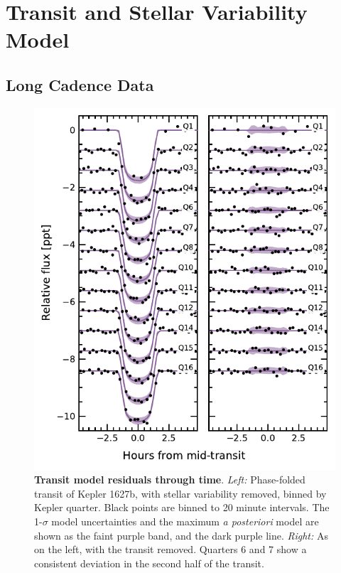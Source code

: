 \documentclass[12pt,modern,tighten]{aastex63}
\begin{document}
\section{Transit and Stellar Variability Model}
\label{app:gptransit}

\subsection{Long Cadence Data}
\begin{figure}[t]
	\begin{center}
		\leavevmode
		\includegraphics[width=1\textwidth]{f9.pdf}
	\end{center}
	\vspace{-0.7cm}
	\caption{
		{\bf Transit model residuals through time}.  
    {\it Left:}
		Phase-folded transit of Kepler 1627b, with stellar
    variability removed, binned by Kepler quarter.
    Black points are binned to 20 minute intervals.
    The 1-$\sigma$ model uncertainties and the maximum {\it a
    posteriori} model are shown as the faint purple band, and the dark
    purple line.
    {\it Right:}
    As on the left, with the transit removed.
    Quarters 6 and 7 show a consistent deviation in the second half of
    the transit.
		\label{fig:phasequarter}
	}
\end{figure}
\end{document}
